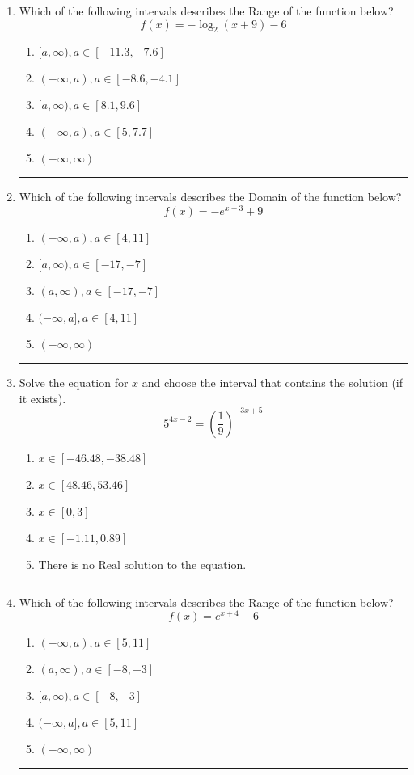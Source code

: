 \documentclass[14pt]{extbook}
\newcommand{\litem}[1]{\item#1\hspace*{-1cm}\rule{\textwidth}{0.4pt}}
\begin{document}
\begin{enumerate}
\litem{
Which of the following intervals describes the Range of the function below?\[ f(x) = -\log_2{(x+9)}-6 \]\begin{enumerate}[label=\Alph*.]
\item \( [a, \infty), a \in [-11.3, -7.6] \)
\item \( (-\infty, a), a \in [-8.6, -4.1] \)
\item \( [a, \infty), a \in [8.1, 9.6] \)
\item \( (-\infty, a), a \in [5, 7.7] \)
\item \( (-\infty, \infty) \)

\end{enumerate} }
\litem{
Which of the following intervals describes the Domain of the function below?\[ f(x) = -e^{x-3}+9 \]\begin{enumerate}[label=\Alph*.]
\item \( (-\infty, a), a \in [4, 11] \)
\item \( [a, \infty), a \in [-17, -7] \)
\item \( (a, \infty), a \in [-17, -7] \)
\item \( (-\infty, a], a \in [4, 11] \)
\item \( (-\infty, \infty) \)

\end{enumerate} }
\litem{
Solve the equation for $x$ and choose the interval that contains the solution (if it exists).\[ 5^{4x-2} = \left(\frac{1}{9}\right)^{-3x+5} \]\begin{enumerate}[label=\Alph*.]
\item \( x \in [-46.48, -38.48] \)
\item \( x \in [48.46, 53.46] \)
\item \( x \in [0, 3] \)
\item \( x \in [-1.11, 0.89] \)
\item \( \text{There is no Real solution to the equation.} \)

\end{enumerate} }
\litem{
Which of the following intervals describes the Range of the function below?\[ f(x) = e^{x+4}-6 \]\begin{enumerate}[label=\Alph*.]
\item \( (-\infty, a), a \in [5, 11] \)
\item \( (a, \infty), a \in [-8, -3] \)
\item \( [a, \infty), a \in [-8, -3] \)
\item \( (-\infty, a], a \in [5, 11] \)
\item \( (-\infty, \infty) \)


\end{enumerate}}
\end{enumerate}
\end{document}
